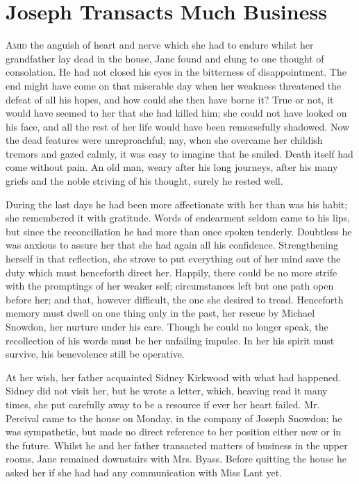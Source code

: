 \chapter{Joseph Transacts Much Business}

\textsc{Amid} the anguish of heart and nerve which she had to endure
whilst her grandfather lay dead in the house, Jane found and clung to
one thought of consolation. He had not closed his eyes in the bitterness
of disappointment. The end might have come on that miserable day when
her weakness threatened the defeat of all his hopes, and how could she
then have borne it? True or not, it would have seemed to her that she
had killed him; she could not have looked on his face, and all the rest
of her life would have been remorsefully shadowed. Now the dead features
were unreproachful; nay, when she overcame her childish tremors and
gazed calmly, it was easy to imagine that he smiled. Death itself had
come without pain. An old man, weary after his long journeys,
{\protect\hypertarget{218}{}{}}after his many griefs and the noble
striving of his thought, surely he rested well.

During the last days he had been more affectionate with her than was his
habit; she remembered it with gratitude. Words of endearment seldom came
to his lips, but since the reconciliation he had more than once spoken
tenderly. Doubtless he was anxious to assure her that she had again all
his confidence. Strengthening herself in that reflection, she strove to
put everything out of her mind save the duty which must henceforth
direct her. Happily, there could be no more strife with the promptings
of her weaker self; circumstances left but one path open before her; and
that, however difficult, the one she desired to tread. Henceforth memory
must dwell on one thing only in the past, her rescue by Michael Snowdon,
her nurture under his care. Though he could no longer speak, the
recollection of his words must be her unfailing impulse. In her his
spirit must survive, his benevolence still be operative.

At her wish, her father acquainted Sidney Kirkwood with what had
happened. Sidney did not visit her, but he wrote a letter, which,
{\protect\hypertarget{219}{}{}}heaving read it many times, she put
carefully away to be a resource if ever her heart failed. Mr. Percival
came to the house on Monday, in the company of Joseph Snowdon; he was
sympathetic, but made no direct reference to her position either now or
in the future. Whilst he and her father transacted matters of business
in the upper rooms, Jane remained downstairs with Mrs. Byass. Before
quitting the house he asked her if she had had any communication with
Miss Lant yet.

